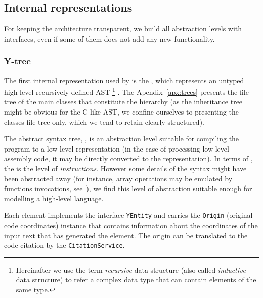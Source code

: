 \subsection{Internal representations}
\label{ch:impl:model}

For keeping the architecture transparent, we build all abstraction levels with interfaces, even if some of them does not add any new functionality.

\subsubsection{Y-tree}
\label{ch:impl:model:ytree}

The first internal representation used by \porthos[2] is the \textit{\ytree{}}, which represents an untyped high-level recursively defined AST%
%
\footnote{Hereinafter we use the term \textit{recursive} data structure (also called \textit{inductive} data structure) to refer a complex data type that can contain elements of the same type.} %
%
. The Apendix~\ref{apx:trees} presents the file tree of the main classes that constitute the \ytree{} hierarchy (as the inheritance tree might be obvious for the C-like AST, we confine ourselves to presenting the classes file tree only, which we tend to retain clearly structured).

The abstract syntax tree, \ytree{}, is an abstraction level suitable for compiling the program to a low-level representation (in the case of processing low-level assembly code, it may be directly converted to the \xgraph{} representation).
In terms of \porthos[1], the \ytree{} is the level of \textit{instructions}.
However some details of the syntax might have been abstracted away (for instance, array operations may be emulated by functions invocations, see~\cite[Chapter 5]{gries2012science}), we find this level of abstraction suitable enough for modelling a high-level language.

Each \ytree{} element implements the interface \texttt{YEntity} and carries the \texttt{Origin} (original code coordinates) instance that contains information about the coordinates of the input text that has generated the \ytree{} element.
The origin can be translated to the code citation by the \texttt{CitationService}.

